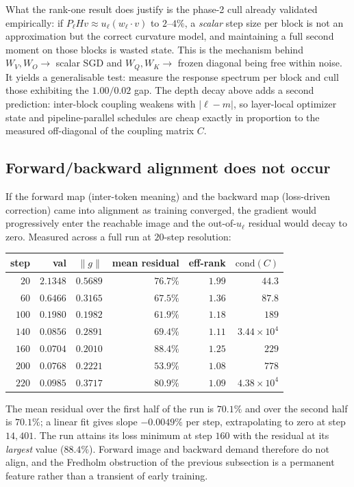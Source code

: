 What the rank-one result does justify is the phase-2 cull already validated
empirically: if $P_\ell H v \approx u_\ell(w_\ell\!\cdot\!v)$ to $2$--$4\%$, a
\emph{scalar} step size per block is not an approximation but the correct
curvature model, and maintaining a full second moment on those blocks is
wasted state. This is the mechanism behind $W_V,W_O \to$ scalar SGD and
$W_Q,W_K \to$ frozen diagonal being free within noise. It yields a
generalisable test: measure the response spectrum per block and cull those
exhibiting the $1.00 / 0.02$ gap. The depth decay above adds a second
prediction: inter-block coupling weakens with $|\ell-m|$, so layer-local
optimizer state and pipeline-parallel schedules are cheap exactly in
proportion to the measured off-diagonal of the coupling matrix $C$.

\subsection{Forward/backward alignment does not occur}

If the forward map (inter-token meaning) and the backward map (loss-driven
correction) came into alignment as training converged, the gradient would
progressively enter the reachable image and the out-of-$u_\ell$ residual would
decay to zero. Measured across a full run at $20$-step resolution:

\begin{center}
\begin{tabular}{rrrrrr}
\toprule
step & val & $\|g\|$ & mean residual & eff-rank & $\mathrm{cond}(C)$ \\
\midrule
$20$  & $2.1348$ & $0.5689$ & $76.7\%$ & $1.99$ & $44.3$ \\
$60$  & $0.6466$ & $0.3165$ & $67.5\%$ & $1.36$ & $87.8$ \\
$100$ & $0.1980$ & $0.1982$ & $61.9\%$ & $1.18$ & $189$ \\
$140$ & $0.0856$ & $0.2891$ & $69.4\%$ & $1.11$ & $3.44{\times}10^{4}$ \\
$160$ & $0.0704$ & $0.2010$ & $88.4\%$ & $1.25$ & $229$ \\
$200$ & $0.0768$ & $0.2221$ & $53.9\%$ & $1.08$ & $778$ \\
$220$ & $0.0985$ & $0.3717$ & $80.9\%$ & $1.09$ & $4.38{\times}10^{4}$ \\
\bottomrule
\end{tabular}
\end{center}

\begin{proposition}
The mean residual over the first half of the run is $70.1\%$ and over the
second half is $70.1\%$; a linear fit gives slope $-0.0049\%$ per step,
extrapolating to zero at step $14{,}401$. The run attains its loss minimum at
step $160$ with the residual at its \emph{largest} value ($88.4\%$). Forward
image and backward demand therefore do not align, and the Fredholm obstruction
of the previous subsection is a permanent feature rather than a transient of
early training.
\end{proposition}

